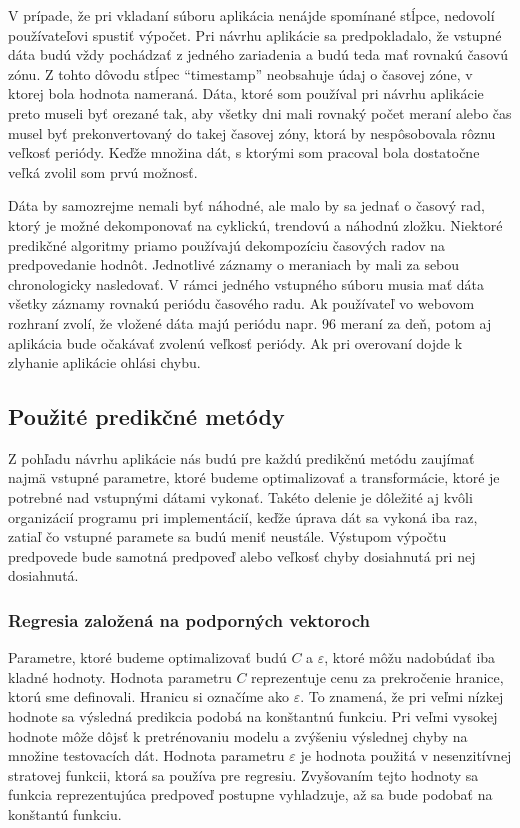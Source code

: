 \documentclass[a4paper,slovak,12pt,appendix]{article}
\begin{document}
V prípade, že pri vkladaní súboru aplikácia nenájde spomínané stĺpce, nedovolí
používateľovi spustiť výpočet. Pri návrhu aplikácie sa predpokladalo, že vstupné
dáta budú vždy pochádzať z jedného zariadenia a budú teda mať rovnakú časovú
zónu. Z tohto dôvodu stĺpec ``timestamp'' neobsahuje údaj o časovej zóne,
v ktorej bola hodnota nameraná. Dáta, ktoré som používal pri návrhu aplikácie
preto museli byť orezané tak, aby všetky dni mali rovnaký počet meraní alebo
čas musel byť prekonvertovaný do takej časovej zóny, ktorá by nespôsobovala
rôznu veľkosť periódy. Keďže množina dát, s ktorými som pracoval bola dostatočne
veľká zvolil som prvú možnosť.

Dáta by samozrejme nemali byť náhodné, ale malo by sa jednať o časový rad,
ktorý je možné dekomponovať na cyklickú, trendovú a náhodnú zložku. Niektoré
predikčné algoritmy priamo používajú dekompozíciu časových radov na
predpovedanie hodnôt. Jednotlivé záznamy o meraniach by mali za sebou
chronologicky nasledovať. V rámci jedného vstupného súboru musia mať dáta
všetky záznamy rovnakú periódu časového radu. Ak používateľ vo webovom rozhraní
zvolí, že vložené dáta majú periódu napr. 96 meraní za deň, potom aj aplikácia
bude očakávať zvolenú veľkosť periódy. Ak pri overovaní dojde k zlyhanie
aplikácie ohlási chybu.


\subsection{Použité predikčné metódy}
Z pohľadu návrhu aplikácie nás budú pre každú predikčnú metódu zaujímať najmä
vstupné parametre, ktoré budeme optimalizovať a transformácie, ktoré je
potrebné nad vstupnými dátami vykonať. Takéto delenie je dôležité aj kvôli
organizácií programu pri implementácií, keďže úprava dát sa vykoná iba raz,
zatiaľ čo vstupné paramete sa budú meniť neustále. Výstupom výpočtu predpovede
bude samotná predpoveď alebo veľkosť chyby dosiahnutá pri nej dosiahnutá.

\subsubsection{Regresia založená na podporných vektoroch}
Parametre, ktoré budeme optimalizovať budú $C$ a $\varepsilon$, ktoré môžu
nadobúdať iba kladné hodnoty. Hodnota parametru $C$ reprezentuje cenu za
prekročenie hranice, ktorú sme definovali. Hranicu si označíme ako $\varepsilon$.
To znamená, že pri veľmi nízkej hodnote sa výsledná predikcia podobá na
konštantnú funkciu. Pri veľmi vysokej hodnote môže dôjsť k pretrénovaniu modelu
a zvýšeniu výslednej chyby na množine testovacích dát. Hodnota parametru
$\varepsilon$ je hodnota použitá v nesenzitívnej stratovej funkcii, ktorá sa
používa pre regresiu. Zvyšovaním tejto hodnoty sa funkcia reprezentujúca
predpoveď postupne vyhladzuje, až sa bude podobať na konštantú funkciu.
\end{document}

